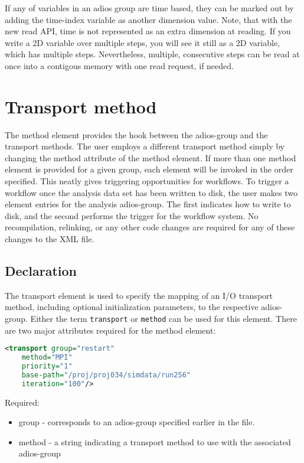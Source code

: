 If any of variables in an adios group are time based, they can be marked out by 
adding the time-index variable as another dimension value. Note, that with the new
read API, time is not represented as an extra dimension at reading. If you write a
2D variable over multiple steps, you will see it still as a 2D variable, which has
multiple steps. Nevertheless, multiple, consecutive steps can be read at once into
a contigous memory with one read request, if needed.


\section{Transport method} 

The method element provides the 
hook between the adios-group and the transport methods. The user employs a different 
transport method simply by changing the method attribute of the method element. 
If more than one method element is provided for a given group, each element will 
be invoked in the order specified. This neatly gives triggering opportunities for 
workflows. To trigger a workflow once the analysis data set has been written to 
disk, the user makes two element entries for the analysis adios-group. The first 
indicates how to write to disk, and the second performs the trigger for the workflow 
system. No recompilation, relinking, or any other code changes are required for 
any of these changes to the XML file.

\subsection{Declaration}

The transport element is used to specify the mapping of an I/O transport method, 
including optional initialization parameters, to the respective adios-group. 
Either the term \verb+transport+ or \verb+method+ can be used for this element. 
There are two major attributes required for the method element: 
\begin{lstlisting}[language=XML]
<transport group="restart"
    method="MPI"
    priority="1" 
    base-path="/proj/proj034/simdata/run256" 
    iteration="100"/>
\end{lstlisting}

Required:
\begin{itemize}
\item group - corresponds to an adios-group specified earlier in the file.
\item method - a string indicating a transport method to use with the associated adios-group
\end{itemize}

